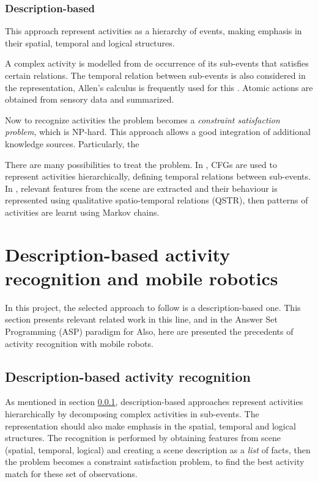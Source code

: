 \subsubsection{Description-based} \label{sec_description_ap}
This approach represent activities as a hierarchy of events, making emphasis in their spatial, temporal and logical structures.

A complex activity is modelled from de occurrence of its sub-events that satisfies certain relations.
The temporal relation between sub-events is also considered in the representation, Allen's calculus is frequently used for this \citep{Allen83_MaintainingKnowledgeTemporal}.
Atomic actions are obtained from sensory data and summarized. %

Now to recognize activities the problem becomes a \textit{constraint satisfaction problem}, which is NP-hard.
This approach allows a good integration of additional knowledge sources. 
Particularly, the 

There are many possibilities to treat the problem. In \citep{Nevatia2004_OntoVidEvRep,Ryoo2006_RecHuAcCFG}, CFGs are used to represent activities hierarchically, defining temporal relations between sub-events. 
In \citep{Sridhar10_UnsupervisedLearning}, relevant features from the scene are extracted and their behaviour is represented using qualitative spatio-temporal relations (QSTR), then patterns of activities are learnt using Markov chains.



\section{Description-based activity recognition and mobile robotics}

In this project, the selected approach to follow is a description-based one. 
This section presents relevant related work in this line, and in the Answer Set Programming (ASP) paradigm for 
Also, here are presented the precedents of activity recognition with mobile robots.

\subsection{Description-based activity recognition}

As mentioned in section \ref{sec_description_ap}, description-based approaches represent activities hierarchically by decomposing complex activities in sub-events.
The representation should also make emphasis in the spatial, temporal and logical structures.
The recognition is performed by obtaining features from scene (spatial, temporal, logical) and creating a scene description as a \textit{list} of facts, then the problem becomes a constraint satisfaction problem, to find the best activity match for these set of observations. 

